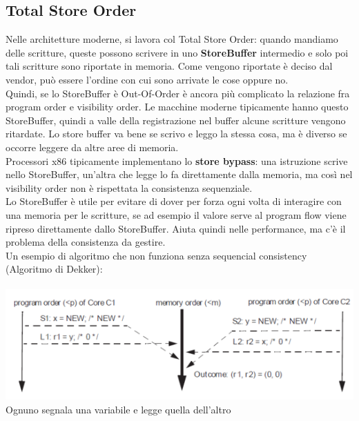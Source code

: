 \documentclass[14pt, oneside]{book}
\begin{document}
\subsection{Total Store Order}
Nelle architetture moderne, si lavora col Total Store Order: quando mandiamo delle scritture, queste possono scrivere in uno \textbf{StoreBuffer} intermedio e solo poi tali scritture sono riportate in memoria. Come vengono riportate è deciso dal vendor, può essere l'ordine con cui sono arrivate le cose oppure no.\\ Quindi, se lo StoreBuffer è Out-Of-Order è ancora più complicato la relazione fra program order e visibility order. Le macchine moderne tipicamente hanno questo StoreBuffer, quindi a valle della registrazione nel buffer alcune scritture vengono ritardate. Lo store buffer va bene se scrivo e leggo la stessa cosa, ma è diverso se occorre leggere da altre aree di memoria. \\ Processori x86 tipicamente implementano lo \textbf{store bypass}: una istruzione scrive nello StoreBuffer, un'altra che legge lo fa direttamente dalla memoria, ma così nel visibility order non è rispettata la consistenza sequenziale.\\ Lo StoreBuffer è utile per evitare di dover per forza ogni volta di interagire con una memoria per le scritture, se ad esempio il valore serve al program flow viene ripreso direttamente dallo StoreBuffer. Aiuta quindi nelle performance, ma c'è il problema della consistenza da gestire.\\ Un esempio di algoritmo che non funziona senza sequencial consistency (Algoritmo di Dekker):\\\\
\includegraphics[scale=0.5]{immagini/dekker}
\\ Ognuno segnala una variabile e legge quella dell'altro
\end{document}

